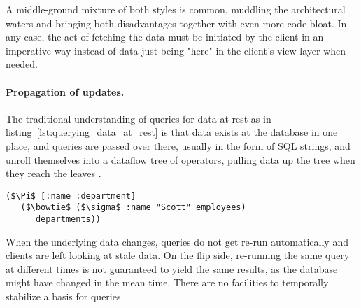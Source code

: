 A middle-ground mixture of both styles is common, muddling the architectural waters and bringing both disadvantages together with even more code bloat. In any case, the act of fetching the data must be initiated by the client in an imperative way instead of data just being "here" in the client's view layer when needed.


\paragraph{Propagation of updates.}
The traditional understanding of queries for data at rest as in listing~\ref{lst:querying_data_at_rest} is that data exists at the database in one place, and queries are passed over there, usually in the form of SQL strings, and unroll themselves into a dataflow tree of operators, pulling data up the tree when they reach the leaves \cite{alvaro2015isee}.

\begin{lstlisting}[label={lst:querying_data_at_rest},morekeywords={employees,departments},caption=Querying data at rest \cite{alvaro2015isee}]
($\Pi$ [:name :department]
   ($\bowtie$ ($\sigma$ :name "Scott" employees)
      departments))
\end{lstlisting}

When the underlying data changes, queries do not get re-run automatically and clients are left looking at stale data. On the flip side, re-running the same query at different times is not guaranteed to yield the same results, as the database might have changed in the mean time. There are no facilities to temporally stabilize a basis for queries.
